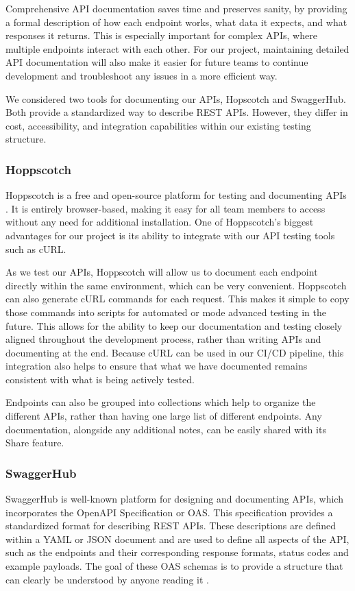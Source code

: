 \documentclass[12pt,titlepage]{article}
\begin{document}
Comprehensive API documentation saves time and preserves sanity, by providing a formal description of how each endpoint works, what data it expects, and what responses it returns. This is especially important for complex APIs, where multiple endpoints interact with each other. For our project, maintaining detailed API documentation will also make it easier for future teams to continue development and troubleshoot any issues in a more efficient way.

We considered two tools for documenting our APIs, Hopscotch and SwaggerHub. Both provide a standardized way to describe REST APIs. However, they differ in cost, accessibility, and integration capabilities within our existing testing structure.
\subsubsection{Hoppscotch}
Hoppscotch is a free and open-source platform for testing and documenting APIs \cite{hoppscotch}. It is entirely browser-based, making it easy for all team members to access without any need for additional installation. One of Hoppscotch’s biggest advantages for our project is its ability to integrate with our API testing tools such as cURL.

As we test our APIs, Hoppscotch will allow us to document each endpoint directly within the same environment, which can be very convenient. Hoppscotch can also generate cURL commands for each request. This makes it simple to copy those commands into scripts for automated or mode advanced testing in the future. This allows for the ability to keep our documentation and testing closely aligned throughout the development process, rather than writing APIs and documenting at the end. Because cURL can be used in our CI/CD pipeline, this integration also helps to ensure that what we have documented remains consistent with what is being actively tested.

Endpoints can also be grouped into collections which help to organize the different APIs, rather than having one large list of different endpoints. Any documentation, alongside any additional notes, can be easily shared with its Share feature.
\subsubsection{SwaggerHub}
SwaggerHub is well-known platform for designing and documenting APIs, which incorporates the OpenAPI Specification or OAS. This specification provides a standardized format for describing REST APIs. These descriptions are defined within a YAML or JSON document and are used to define all aspects of the API, such as the endpoints and their corresponding response formats, status codes and example payloads. The goal of these OAS schemas is to provide a structure that can clearly be understood by anyone reading it \cite{swagger-explore}.
\end{document}
